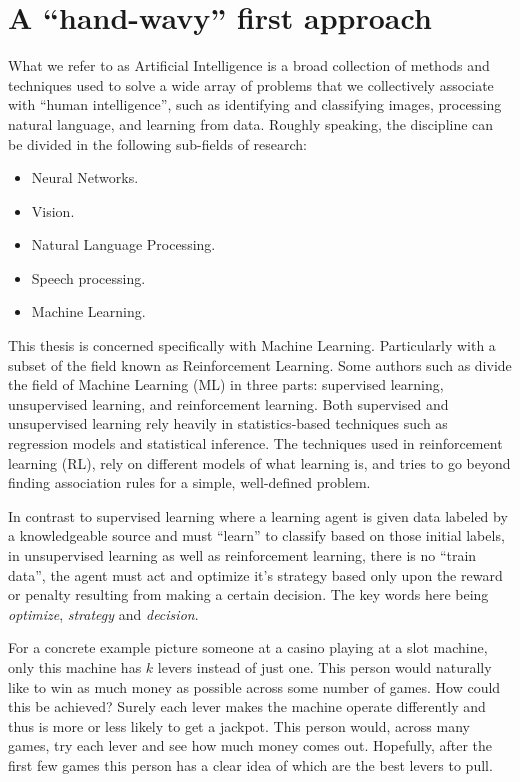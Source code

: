 \section{A ``hand-wavy'' first approach}

What we refer to as Artificial Intelligence is a broad 
collection of methods and techniques used to solve a wide array 
of problems that we collectively associate with ``human 
intelligence'', such as identifying and classifying images, 
processing natural language, and learning from data.  Roughly 
speaking, the discipline can be divided in the following 
sub-fields of research:

\begin{itemize}
	\item Neural Networks.
	\item Vision.
	\item Natural Language Processing.
	\item Speech processing.
	\item Machine Learning.
\end{itemize}

This thesis is concerned specifically with Machine Learning.  
Particularly with a subset of the field known as Reinforcement 
Learning. Some authors such as \cite{SuttonBarto} divide the 
field of Machine Learning (ML) in three parts: supervised 
learning, unsupervised learning, and reinforcement learning.  
Both supervised and unsupervised learning rely heavily in 
statistics-based techniques such as regression models and 
statistical inference. The techniques used in reinforcement 
learning (RL), rely on different models of what learning is, and 
tries to go beyond finding association rules for a simple, 
well-defined problem.

In contrast to supervised learning where a learning agent is 
given data labeled by a knowledgeable source and must ``learn'' 
to classify based on those initial labels, in unsupervised 
learning as well as reinforcement learning, there is no ``train 
data'', the agent must act and optimize it's strategy based only 
upon the reward or penalty resulting from making a certain 
decision.  The key words here being \textit{optimize}, 
\textit{strategy} and \textit{decision}.

For a concrete example picture someone at a casino playing at a 
slot machine, only this machine has $k$ levers instead of just 
one. This person would naturally like to win as much money as 
possible across some number of games. How could this be 
achieved? Surely each lever makes the machine operate 
differently and thus is more or less likely to get a jackpot.  
This person would, across many games, try each lever and see how 
much money comes out. Hopefully, after the first few games this 
person has a clear idea of which are the best levers to pull.

